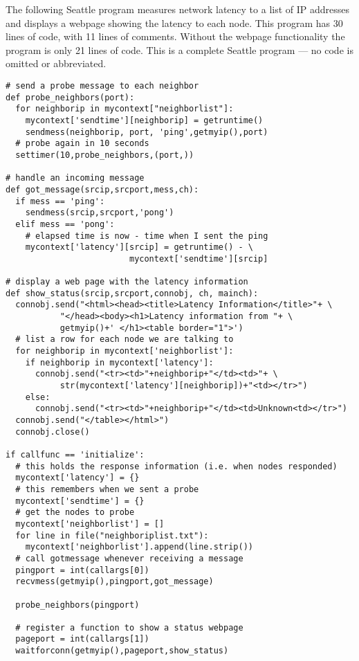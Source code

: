 \appendix

The following Seattle program measures network latency to a list of IP
addresses and displays a webpage showing the latency to each
node. This program has 30 lines of code, with 11 lines of
comments. Without the webpage functionality the program is only 21
lines of code. This is a complete Seattle program --- no code is
omitted or abbreviated.


{
\scriptsize
\begin{verbatim}
# send a probe message to each neighbor
def probe_neighbors(port):
  for neighborip in mycontext["neighborlist"]:
    mycontext['sendtime'][neighborip] = getruntime()
    sendmess(neighborip, port, 'ping',getmyip(),port)
  # probe again in 10 seconds
  settimer(10,probe_neighbors,(port,))

# handle an incoming message
def got_message(srcip,srcport,mess,ch):
  if mess == 'ping':
    sendmess(srcip,srcport,'pong')
  elif mess == 'pong':
    # elapsed time is now - time when I sent the ping
    mycontext['latency'][srcip] = getruntime() - \
                         mycontext['sendtime'][srcip]

# display a web page with the latency information
def show_status(srcip,srcport,connobj, ch, mainch): 
  connobj.send("<html><head><title>Latency Information</title>"+ \
           "</head><body><h1>Latency information from "+ \
           getmyip()+' </h1><table border="1">')
  # list a row for each node we are talking to 
  for neighborip in mycontext['neighborlist']:
    if neighborip in mycontext['latency']:
      connobj.send("<tr><td>"+neighborip+"</td><td>"+ \
           str(mycontext['latency'][neighborip])+"<td></tr>")
    else:
      connobj.send("<tr><td>"+neighborip+"</td><td>Unknown<td></tr>")
  connobj.send("</table></html>")
  connobj.close()

if callfunc == 'initialize':
  # this holds the response information (i.e. when nodes responded)
  mycontext['latency'] = {}
  # this remembers when we sent a probe
  mycontext['sendtime'] = {}
  # get the nodes to probe
  mycontext['neighborlist'] = []
  for line in file("neighboriplist.txt"):
    mycontext['neighborlist'].append(line.strip())
  # call gotmessage whenever receiving a message
  pingport = int(callargs[0])
  recvmess(getmyip(),pingport,got_message)  
  
  probe_neighbors(pingport)

  # register a function to show a status webpage
  pageport = int(callargs[1])
  waitforconn(getmyip(),pageport,show_status)  
\end{verbatim}
}
